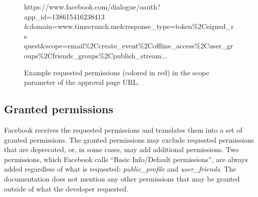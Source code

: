 \documentclass{sig-alternate}
\begin{document}
\begin{figure}[tb!]
  {\small{\selectfont %
https://www.facebook.com/dialogue/oauth?app\_id=138615416238413\\
\&domain=www.timecrunch.me\&response\_type=token\%2Csigned\_re\\
quest\&{\color{darkred}scope=email\%2Ccreate\_event\%2Coffline\_access\%2Cuser\_gr\\
oups\%2Cfriends\_groups\%2Cpublish\_stream}...}}
\caption{Example requested permissions (colored in red) in the scope parameter of the approval page URL.
  }
  \label{figure:scopeinurl}
\end{figure}
\subsection{Granted permissions}

Facebook receives the requested permissions and translates them into a set of granted permissions. The granted permissions may exclude requested permissions that are deprecated, or, in some cases, may add additional permissions. 
Two permissions, which Facebook calls ``Basic Info/Default permissions''\cite{fbpermsinstructions}, are always added regardless of what is requested: \emph{public\_profile} and \emph{user\_friends}. The documentation does not mention any other permissions that may be granted outside of what the developer requested.
\end{document}
